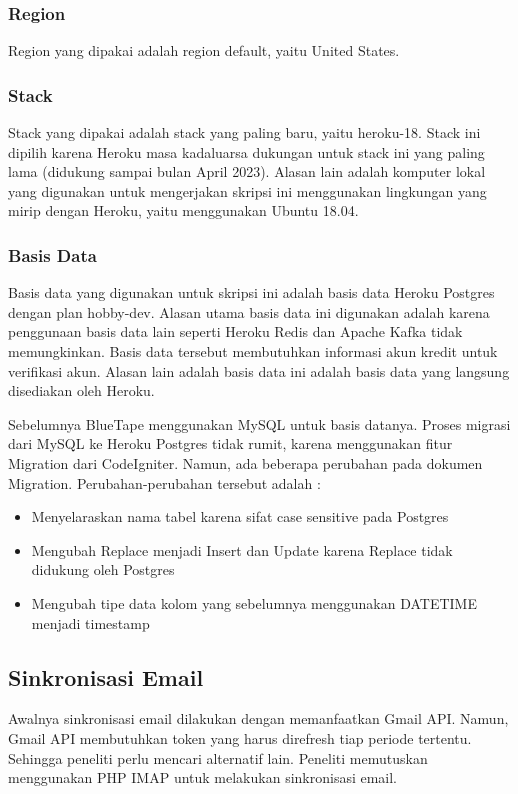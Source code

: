 	\subsubsection{Region}
		Region yang dipakai adalah region default, yaitu United States.
		
	\subsubsection{Stack}
		Stack yang dipakai adalah stack yang paling baru, yaitu heroku-18. Stack ini dipilih karena Heroku masa kadaluarsa dukungan untuk stack ini yang paling lama (didukung sampai bulan April 2023). Alasan lain adalah komputer lokal yang digunakan untuk mengerjakan skripsi ini menggunakan lingkungan yang mirip dengan Heroku, yaitu menggunakan Ubuntu 18.04.

	\subsubsection{Basis Data}
		Basis data yang digunakan untuk skripsi ini adalah basis data Heroku Postgres dengan plan hobby-dev. Alasan utama basis data ini digunakan adalah karena penggunaan basis data lain seperti Heroku Redis dan Apache Kafka tidak memungkinkan. Basis data tersebut membutuhkan informasi akun kredit untuk verifikasi akun. Alasan lain adalah basis data ini adalah basis data yang langsung disediakan oleh Heroku.
	
		Sebelumnya BlueTape menggunakan MySQL untuk basis datanya. Proses migrasi dari MySQL ke Heroku Postgres tidak rumit, karena menggunakan fitur Migration dari CodeIgniter. Namun, ada beberapa perubahan pada dokumen Migration. Perubahan-perubahan tersebut adalah :
	\begin{itemize}
		\item Menyelaraskan nama tabel karena sifat case sensitive pada Postgres
		\item Mengubah Replace menjadi Insert dan Update karena Replace tidak didukung oleh Postgres
		\item Mengubah tipe data kolom yang sebelumnya menggunakan DATETIME menjadi timestamp
	\end{itemize}  

\subsection{Sinkronisasi Email}
\label{sec:analisisemail}
	Awalnya sinkronisasi email dilakukan dengan memanfaatkan Gmail API. Namun, Gmail API membutuhkan token yang harus direfresh tiap periode tertentu. Sehingga peneliti perlu mencari alternatif lain. Peneliti memutuskan menggunakan PHP IMAP untuk melakukan sinkronisasi email.
	
